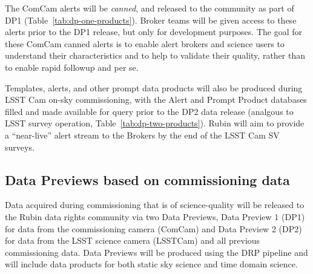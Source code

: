 The ComCam alerts will be {\it canned}, and released to the community as part of DP1 (Table~\ref{tab:dp-one-products}).
Broker teams will be given access to these alerts prior to the DP1 release, but only for development purposes.
The goal for these ComCam canned alerts is to enable alert brokers and science users to understand their characteristics and to help to validate their quality, rather than to enable rapid followup and \es per se.

Templates, alerts, and other prompt data products will also be produced during LSST Cam on-sky commissioning, with the Alert and Prompt Product databases filled and made available for query prior to the DP2 data release (analgous to LSST survey operation, Table~\ref{tab:dp-two-products}). 
Rubin will aim to provide a ``near-live'' alert stream to the Brokers by the end of the LSST Cam SV surveys.


\subsection{Data Previews based on commissioning data}

Data acquired during commissioning that is of science-quality will be released to the Rubin data rights community via two Data Previews, Data Preview 1 (DP1) for data from the commissioning camera (ComCam) and Data Preview 2 (DP2) for data from the LSST science camera (LSSTCam) and all previous commissioning data.
Data Previews will be produced using the DRP pipeline and will include data products for both static sky science and time domain science.
